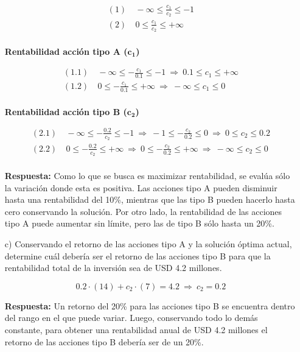 \documentclass[letterpaper,11pt,oneside]{article}
\begin{document}
\begin{itemize}
	\begin{equation*}
	\begin{split}
	(1)&\ -\infty \leq \frac{c_{1}}{c_{2}} \leq -1\\
	(2)&\ 0 \leq \frac{c_{1}}{c_{2}} \leq +\infty\\
	\end{split}
	\end{equation*}
	
	\textbf{Rentabilidad acción tipo A ($\mathbf{c_{1}}$)}
	
	\begin{equation*}
	\begin{split}
	(1.1)&\ -\infty \leq -\frac{c_{1}}{0.1} \leq -1\ \Rightarrow\ 0.1 \leq c_{1} \leq +\infty\\
	(1.2)&\ 0 \leq -\frac{c_{1}}{0.1} \leq +\infty\ \Rightarrow\ -\infty \leq c_{1} \leq 0\\
	\end{split}
	\end{equation*}
	
	\textbf{Rentabilidad acción tipo B ($\mathbf{c_{2}}$)}
	
	\begin{equation*}
	\begin{split}
	(2.1)&\ -\infty \leq -\frac{0.2}{c_{2}} \leq -1\ \Rightarrow\ -1 \leq -\frac{c_{2}}{0.2} \leq 0\ \Rightarrow\ 0 \leq c_{2} \leq 0.2\\
	(2.2)&\ 0 \leq -\frac{0.2}{c_{2}} \leq +\infty\ \Rightarrow\ 0 \leq -\frac{c_{2}}{0.2} \leq +\infty\ \Rightarrow\ -\infty \leq c_{2} \leq 0\\
	\end{split}
	\end{equation*}
	
	\textbf{Respuesta:} Como lo que se busca es maximizar rentabilidad, se evalúa sólo la variación donde esta es positiva. Las acciones tipo A pueden disminuir hasta una rentabilidad del 10\%, mientras que las tipo B pueden hacerlo hasta cero conservando la solución. Por otro lado, la rentabilidad de las acciones tipo A puede aumentar sin límite, pero las de tipo B sólo hasta un 20\%.
	
	\item[c)] Conservando el retorno de las acciones tipo A y la solución óptima actual, determine cuál debería ser el retorno de las acciones tipo B para que la rentabilidad total de la inversión sea de USD 4.2 millones.
	
	\begin{equation*}
	0.2\cdot(14)+c_{2}\cdot(7)=4.2\ \Rightarrow\ c_{2}=0.2
	\end{equation*}
	
	\textbf{Respuesta:} Un retorno del 20\% para las acciones tipo B se encuentra dentro del rango en el que puede variar. Luego, conservando todo lo demás constante, para obtener una rentabilidad anual de USD 4.2 millones el retorno de las acciones tipo B debería ser de un 20\%.
\end{itemize}
\end{document}
